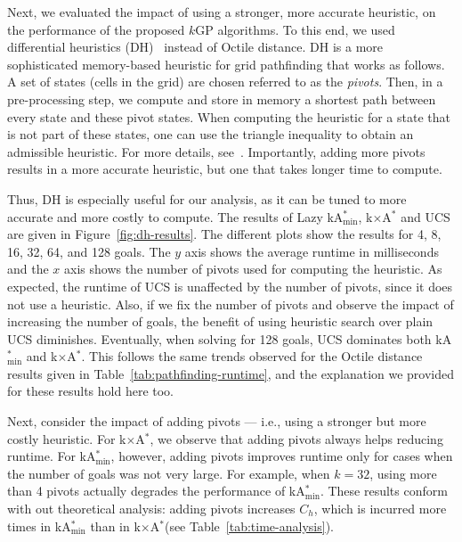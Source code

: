 \documentclass[twoside,11pt]{article}
\newcommand{\kgs}{$k$GP\xspace}
\newcommand{\kastarvar}[1]{\textup{kA}$^*_{#1}$\xspace}
\newcommand{\kastarmin}{\kastarvar{\min}}
\newcommand{\kxastar}{k$\times$A$^*$\xspace}
\begin{document}
Next, we evaluated the impact of using a stronger, more accurate heuristic, on the performance of the proposed \kgs algorithms.
To this end, we used differential heuristics (DH)~\cite{goldberg2005computing,ng2002predicting,SturtevantFBSN2009} instead of Octile distance.
DH is a more sophisticated memory-based heuristic for grid pathfinding that works as follows.
A set of states (cells in the grid) are chosen  referred to as the \emph{pivots}.
Then, in a pre-processing step, we compute and store in memory a shortest path between every state and these pivot states.
When computing the heuristic for a state that is not part of these states, one can use the triangle inequality to obtain an admissible heuristic.
For more details, see~\cite{goldberg2005computing,ng2002predicting,SturtevantFBSN2009}.
Importantly, adding more pivots results in a more accurate heuristic, but one that takes longer time to compute.


Thus, DH is especially useful for our analysis, as it can be tuned to more accurate and more costly to compute.
The results of Lazy \kastarmin, \kxastar and UCS are given in Figure~\ref{fig:dh-results}.
The different plots show the results for 4, 8, 16, 32, 64, and 128 goals.
The $y$ axis shows the average runtime in milliseconds and the $x$ axis shows the number of pivots used for computing the heuristic.
As expected, the runtime of UCS is unaffected by the number of pivots, since it does not use a heuristic.
Also, if we fix the number of pivots and observe the impact of increasing the number of goals, the benefit of using heuristic search over plain UCS diminishes.
Eventually, when solving for 128 goals, UCS dominates both \kastarmin and \kxastar.
This follows the same trends observed for the Octile distance results given in Table~\ref{tab:pathfinding-runtime}, and the explanation we provided for these results hold here too.


Next, consider the impact of adding pivots --- i.e., using a stronger but more costly heuristic.
For \kxastar, we observe that adding pivots always helps reducing runtime.
For \kastarmin, however, adding pivots improves runtime only for cases when the number of goals was not very large.
For example, when $k = 32$, using more than 4 pivots actually degrades the performance of \kastarmin.
These results conform with out theoretical analysis: adding pivots increases $C_h$, which is incurred more times in \kastarmin than in \kxastar (see Table~\ref{tab:time-analysis}).
\end{document}
